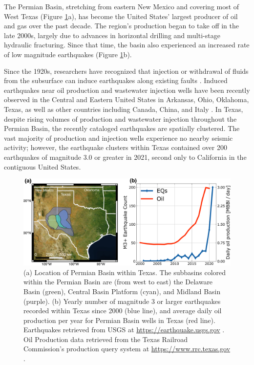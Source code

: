 \documentclass{utexasthesis}
\begin{document}
The Permian Basin, stretching from eastern New Mexico and covering most of West Texas (Figure \ref{fig:permian-overview}a), has become the United States' largest producer of oil and gas over the past decade. The region's production began to take off in the late 2000s, largely due to advances in horizontal drilling and multi-stage hydraulic fracturing.
Since that time, the basin also experienced an increased rate of low magnitude earthquakes \citep{Frohlich2016HistoricalReviewInduced, Atkinson2016HydraulicFracturingSeismicity, Frohlich2019OnsetCauseIncreased, Lomax2019ImprovingAbsoluteEarthquake, Savvaidis2020InducedSeismicityDelaware, Skoumal2020InducedSeismicityDelaware} (Figure \ref{fig:permian-overview}b).


Since the 1920s, researchers have recognized that injection or withdrawal of fluids from the subsurface can induce earthquakes along existing faults \citep{Council2013InducedSeismicityPotential, Simpson1988TwoTypesReservoir, Ellsworth2013InjectionInducedEarthquakes}.  Induced earthquakes near oil production and wastewater injection wells have been recently observed in the Central and Eastern United States in Arkansas, Ohio, Oklahoma, Texas, as well as other countries including Canada, China, and Italy \citep{Foulger2018GlobalReviewHuman}.  In Texas, despite rising volumes of production and wastewater injection throughout the Permian Basin, the recently cataloged earthquakes are spatially clustered. The vast majority of production and injection wells experience no nearby seismic activity; however, the earthquake clusters within Texas contained over 200 earthquakes of magnitude 3.0 or greater in 2021, second only to California in the contiguous United States.


\begin{figure}
	\centering
	\includegraphics[width=\columnwidth]{figures/permian-overview-eqs-oil.pdf}
	\caption[Permian Basin oil production and earthquakes]{
		(a) Location of Permian Basin within Texas. The subbasins colored within the Permian Basin are (from west to east) the Delaware Basin (green), Central Basin Platform (cyan), and Midland Basin (purple).
		(b) Yearly number of magnitude 3 or larger earthquakes recorded within Texas since 2000 (blue line), and average daily oil production per year for Permian Basin wells in Texas (red line).
		Earthquakes retrieved from USGS at \url{https://earthquake.usgs.gov} . Oil Production data retrieved from the Texas Railroad Commission's production query system at \url{https://www.rrc.texas.gov} .
	}
	\label{fig:permian-overview}
\end{figure}
\end{document}
